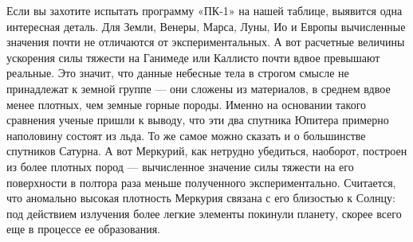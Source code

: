 \documentclass[11pt,a4paper,oneside]{article}
\begin{document}
Если вы захотите испытать программу «ПК-1» на нашей таблице, выявится одна интересная деталь. Для Земли, Венеры, Марса, Луны, Ио и Европы вычисленные значения почти не отличаются от экспериментальных. А вот расчетные величины ускорения силы тяжести на Ганимеде или Каллисто почти вдвое превышают реальные. Это значит, что данные небесные тела в строгом смысле не принадлежат к земной группе — они сложены из материалов, в среднем вдвое менее плотных, чем земные горные породы. Именно на основании такого сравнения ученые пришли к выводу, что эти два спутника Юпитера примерно наполовину состоят из льда. То же самое можно сказать и о большинстве спутников Сатурна. А вот Меркурий, как нетрудно убедиться, наоборот, построен из более плотных пород — вычисленное значение силы тяжести на его поверхности в полтора раза меньше полученного экспериментально. Считается, что аномально высокая плотность Меркурия связана с его близостью к Солнцу: под действием излучения более легкие элементы покинули планету, скорее всего еще в процессе ее образования.
\end{document}
